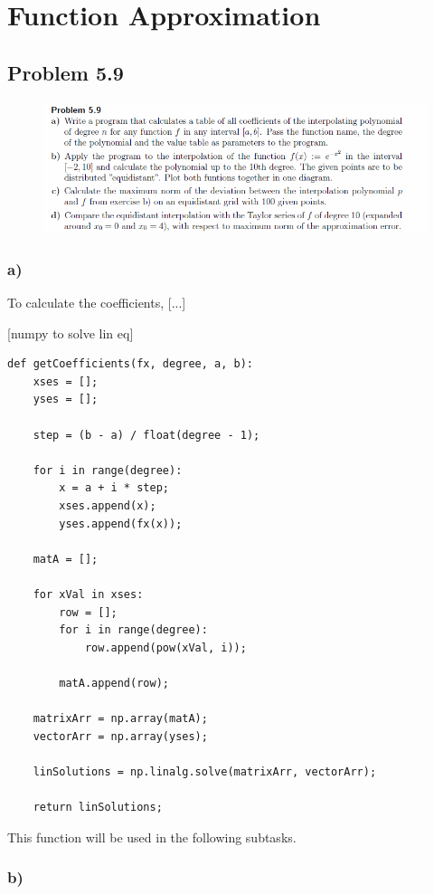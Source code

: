 \section{Function Approximation}


\subsection{Problem 5.9}


\begin{figure}[!ht]
\includegraphics[width=1\textwidth]{chapters/images/desc-5-9}
\end{figure}


\subsubsection{a)}

To calculate the coefficients, [...]

[numpy to solve lin eq]

\begin{lstlisting}[caption=Problem 5.9 a)]
def getCoefficients(fx, degree, a, b):
	xses = [];
	yses = [];
	
	step = (b - a) / float(degree - 1);
	
	for i in range(degree):
		x = a + i * step;
		xses.append(x);
		yses.append(fx(x));
	
	matA = [];
	
	for xVal in xses:
		row = [];
		for i in range(degree):
			row.append(pow(xVal, i));
		
		matA.append(row);
	
	matrixArr = np.array(matA);
	vectorArr = np.array(yses);
	
	linSolutions = np.linalg.solve(matrixArr, vectorArr);
	
	return linSolutions;
\end{lstlisting}

This function will be used in the following subtasks.


\subsubsection{b)}

